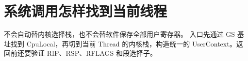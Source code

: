 \chapter{系统调用怎样找到当前线程}

 不会自动替内核选择栈，也不会替软件保存全部用户寄存器。
入口先通过 GS 基址找到 CpuLocal，再切到当前 Thread 的内核栈，构造统一的
UserContext。返回前还要验证 RIP、RSP、RFLAGS 和段选择子。



